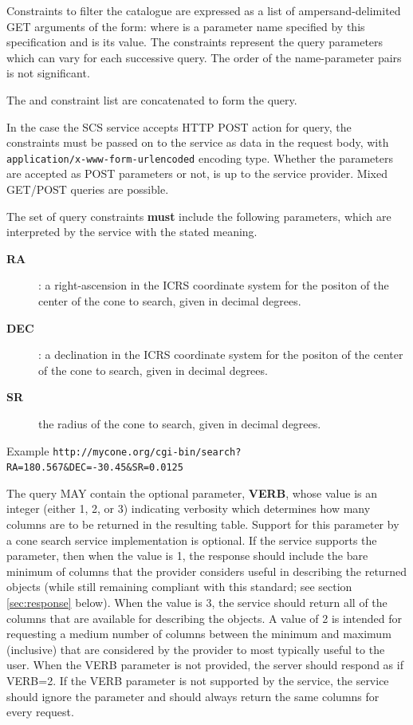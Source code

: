 \documentclass[11pt,a4paper]{ivoa}
\begin{document}
Constraints to filter the catalogue are expressed as a list of ampersand-delimited GET arguments of the form:  where  is a parameter name specified by this specification and  is its value. The constraints represent the query parameters which can vary for each successive query. The order of the name-parameter pairs is not significant.

The  and constraint list are concatenated to form the query.

In the case the SCS service accepts HTTP POST action for query, the  constraints must be passed on to the service as data in the request body, with \texttt{application/x-www-form-urlencoded} encoding type. Whether the  parameters are accepted as POST parameters or not, is up to the service provider. Mixed GET/POST queries are possible.

The set of query constraints \textbf{must} include the following parameters, which are interpreted by the service with the stated meaning.
\begin{description}
	\item[\textbf{RA}]: a right-ascension in the ICRS coordinate system for the positon of the center of the cone to search, given in decimal degrees.
	\item[\textbf{DEC}]: a declination in the ICRS coordinate system for the positon of the center of the cone to search, given in decimal degrees.
	\item[\textbf{SR}] the radius of the cone to search, given in decimal degrees.
\end{description}
\begin{bigdescription}
	\item[Example] \texttt{http://mycone.org/cgi-bin/search?RA=180.567\&DEC=-30.45\&SR=0.0125}
\end{bigdescription}

The query MAY contain the optional parameter, \textbf{VERB}, whose value is an integer (either 1, 2, or 3) indicating verbosity which determines how many columns are to be returned in the resulting table. Support for this parameter by a cone search service implementation is optional. If the service supports the parameter, then when the value is 1, the response should include the bare minimum of columns that the provider considers useful in describing the returned objects (while still remaining compliant with this standard; see section \ref{sec:response} below). When the value is 3, the service should return all of the columns that are available for describing the objects. A value of 2 is intended for requesting a medium number of columns between the minimum and maximum (inclusive) that are considered by the provider to most typically useful to the user. When the VERB parameter is not provided, the server should respond as if VERB=2. If the VERB parameter is not supported by the service, the service should ignore the parameter and should always return the same columns for every request.
\end{document}
